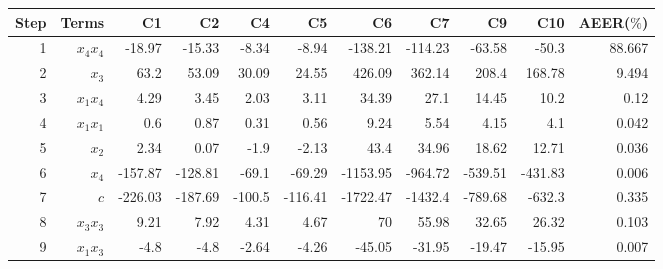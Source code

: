 \begin{tabular}{rrrrrrrrrrr}
Step & Terms & C1 & C2 & C4 & C5 & C6 & C7 & C9 & C10 & AEER($\%$) \\ 
\hline 
1 & $x_4 x_4$ & -18.97 & -15.33 & -8.34 & -8.94 & -138.21 & -114.23 & -63.58 & -50.3 & 88.667 \\ 
2 & $x_3$ & 63.2 & 53.09 & 30.09 & 24.55 & 426.09 & 362.14 & 208.4 & 168.78 & 9.494 \\ 
3 & $x_1 x_4$ & 4.29 & 3.45 & 2.03 & 3.11 & 34.39 & 27.1 & 14.45 & 10.2 & 0.12 \\ 
4 & $x_1 x_1$ & 0.6 & 0.87 & 0.31 & 0.56 & 9.24 & 5.54 & 4.15 & 4.1 & 0.042 \\ 
5 & $x_2$ & 2.34 & 0.07 & -1.9 & -2.13 & 43.4 & 34.96 & 18.62 & 12.71 & 0.036 \\ 
6 & $x_4$ & -157.87 & -128.81 & -69.1 & -69.29 & -1153.95 & -964.72 & -539.51 & -431.83 & 0.006 \\ 
7 & $c$ & -226.03 & -187.69 & -100.5 & -116.41 & -1722.47 & -1432.4 & -789.68 & -632.3 & 0.335 \\ 
8 & $x_3 x_3$ & 9.21 & 7.92 & 4.31 & 4.67 & 70 & 55.98 & 32.65 & 26.32 & 0.103 \\ 
9 & $x_1 x_3$ & -4.8 & -4.8 & -2.64 & -4.26 & -45.05 & -31.95 & -19.47 & -15.95 & 0.007 \\ 
\hline 
\end{tabular}